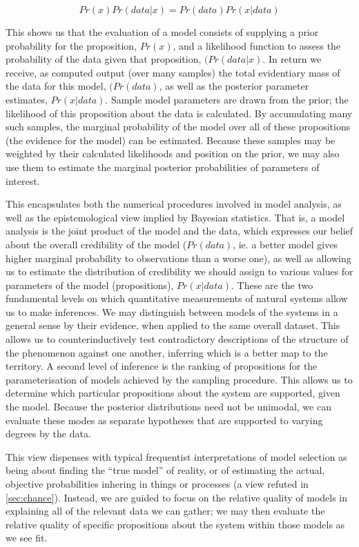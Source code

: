 \[Pr(x)Pr(data|x) = Pr(data)Pr(x|data)\]

This shows us that the evaluation of a model consists of supplying a prior probability for the proposition, $Pr(x)$, and a likelihood function to assess the probability of the data given that proposition, $(Pr(data|x)$. In return we receive, as computed output (over many samples) the total evidentiary mass of the data for this model, $(Pr(data)$, as well as the posterior parameter estimates, $Pr(x|data)$. Sample model parameters are drawn from the prior; the likelihood of this proposition about the data is calculated. By accumulating many such samples, the marginal probability of the model over all of these propositions (the evidence for the model) can be estimated. Because these samples may be weighted by their calculated likelihoods and position on the prior, we may also use them to estimate the marginal posterior probabilities of parameters of interest. 

This encapsulates both the numerical procedures involved in model analysis, as well as the epistemological view implied by Bayesian statistics. That is, a model analysis is the joint product of the model and the data, which expresses our belief about the overall credibility of the model ($Pr(data)$, ie. a better model gives higher marginal probability to observations than a worse one), as well as allowing us to estimate the distribution of credibility we should assign to various values for parameters of the model (propositions), $Pr(x|data)$. These are the two fundamental levels on which quantitative measurements of natural systems allow us to make inferences. We may distinguish between models of the systems in a general sense by their evidence, when applied to the same overall dataset. This allows us to counterinductively test contradictory descriptions of the structure of the phenomenon against one another, inferring which is a better map to the territory. A second level of inference is the ranking of propositions for the parameterisation of models achieved by the sampling procedure. This allows us to determine which particular propositions about the system are supported, given the model. Because the posterior distributions need not be unimodal, we can evaluate these modes as separate hypotheses that are supported to varying degrees by the data. 

This view dispenses with typical frequentist interpretations of model selection as being about finding the ``true model'' of reality, or of estimating the actual, objective probabilities inhering in things or processes (a view refuted in \autoref{sec:chance}). Instead, we are guided to focus on the relative quality of models in explaining all of the relevant data we can gather; we may then evaluate the relative quality of specific propositions about the system within those models as we see fit.  

